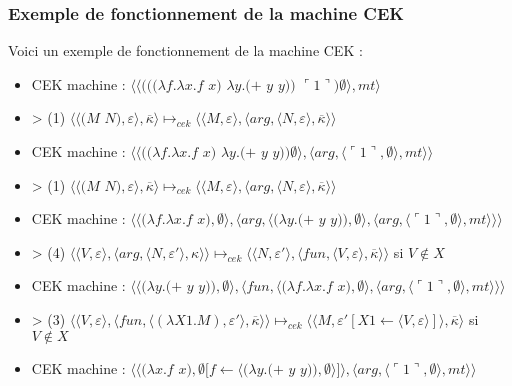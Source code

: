 \documentclass[10pt,a4paper]{report}
\begin{document}
\subsubsection{Exemple de fonctionnement de la machine CEK}\label{CEK}

Voici un exemple de fonctionnement de la machine CEK :

\begin{itemize}
\item[] CEK machine : $\langle\langle(((\lambda f.\lambda x.f$ $x)$ $\lambda y.(+$ $y$ $y))$ $\ulcorner 1\urcorner)\emptyset\rangle,mt\rangle$
\item[] > (1) $\langle\langle(M$ $N),\varepsilon\rangle,\overline{\kappa}\rangle \longmapsto_{cek} \langle \langle M,\varepsilon\rangle,\langle arg,\langle N,\varepsilon\rangle,\overline{\kappa}\rangle\rangle$
\item[] CEK machine : $\langle\langle((\lambda f.\lambda x.f$ $x)$ $\lambda y.(+$ $y$ $y))\emptyset\rangle,\langle arg,\langle\ulcorner 1\urcorner,\emptyset\rangle,mt\rangle\rangle$
\item[] > (1) $\langle\langle(M$ $N),\varepsilon\rangle,\overline{\kappa}\rangle \longmapsto_{cek} \langle \langle M,\varepsilon\rangle,\langle arg,\langle N,\varepsilon\rangle,\overline{\kappa}\rangle\rangle$
\item[] CEK machine : $\langle\langle(\lambda f.\lambda x.f$ $x),\emptyset\rangle,\langle arg,\langle(\lambda y.(+$ $y$ $y)),\emptyset\rangle,\langle arg,\langle\ulcorner 1\urcorner,\emptyset\rangle,mt\rangle\rangle\rangle$
\item[] > (4) $\langle \langle V,\varepsilon\rangle,\langle arg,\langle N,\varepsilon'\rangle,\kappa\rangle\rangle \longmapsto_{cek} \langle \langle N,\varepsilon'\rangle,\langle fun,\langle V,\varepsilon\rangle,\overline{\kappa}\rangle\rangle$ si $V \notin X$
\item[] CEK machine : $\langle\langle(\lambda y.(+$ $y$ $y)),\emptyset\rangle,\langle fun,\langle(\lambda f.\lambda x.f$ $x),\emptyset\rangle,\langle arg,\langle\ulcorner 1\urcorner,\emptyset\rangle,mt\rangle\rangle\rangle$
\item[] > (3) $\langle\langle V,\varepsilon\rangle,\langle fun,\langle (\lambda X1.M),\varepsilon'\rangle,\overline{\kappa} \rangle \rangle \longmapsto_{cek} \langle \langle M,\varepsilon'[X1 \leftarrow \langle V,\varepsilon\rangle]\rangle,\overline{\kappa}\rangle$ si $V \notin X$
\item[] CEK machine : $\langle\langle(\lambda x.f$ $x),\emptyset[f \leftarrow \langle(\lambda y.(+$ $y$ $y)),\emptyset\rangle]\rangle,\langle arg,\langle\ulcorner 1\urcorner,\emptyset\rangle,mt\rangle\rangle$

\end{itemize}
\end{document}

